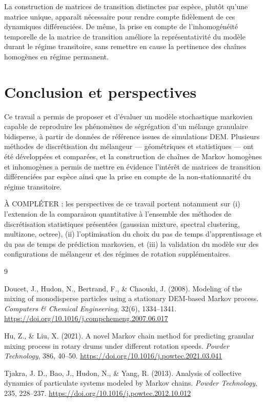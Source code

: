 \documentclass{MemoireMaster}
\begin{document}
La construction de matrices de transition distinctes par espèce, plutôt qu'une matrice unique, apparaît nécessaire pour rendre compte fidèlement de ces dynamiques différenciées. De même, la prise en compte de l'inhomogénéité temporelle de la matrice de transition améliore la représentativité du modèle durant le régime transitoire, sans remettre en cause la pertinence des chaînes homogènes en régime permanent.

\section{Conclusion et perspectives}
Ce travail a permis de proposer et d'évaluer un modèle stochastique markovien capable de reproduire les phénomènes de ségrégation d'un mélange granulaire bidisperse, à partir de données de référence issues de simulations DEM. Plusieurs méthodes de discrétisation du mélangeur --- géométriques et statistiques --- ont été développées et comparées, et la construction de chaînes de Markov homogènes et inhomogènes a permis de mettre en évidence l'intérêt de matrices de transition différenciées par espèce ainsi que la prise en compte de la non-stationnarité du régime transitoire.

À COMPLÉTER : les perspectives de ce travail portent notamment sur (i) l'extension de la comparaison quantitative à l'ensemble des méthodes de discrétisation statistiques présentées (gaussian mixture, spectral clustering, multizone, octree), (ii) l'optimisation du choix du pas de temps d'apprentissage et du pas de temps de prédiction markovien, et (iii) la validation du modèle sur des configurations de mélangeur et des régimes de rotation supplémentaires.

\newpage
\begin{thebibliography}{9}

Doucet, J., Hudon, N., Bertrand, F., \& Chaouki, J. (2008).
Modeling of the mixing of monodisperse particles using a stationary DEM-based Markov process.
\textit{Computers \& Chemical Engineering}, 32(6), 1334--1341.
\url{https://doi.org/10.1016/j.compchemeng.2007.06.017}

Hu, Z., \& Liu, X. (2021).
A novel Markov chain method for predicting granular mixing process in rotary drums under different rotation speeds.
\textit{Powder Technology}, 386, 40--50.
\url{https://doi.org/10.1016/j.powtec.2021.03.041}

Tjakra, J. D., Bao, J., Hudon, N., \& Yang, R. (2013).
Analysis of collective dynamics of particulate systems modeled by Markov chains.
\textit{Powder Technology}, 235, 228--237.
\url{https://doi.org/10.1016/j.powtec.2012.10.012}

\end{thebibliography}
\end{document}
